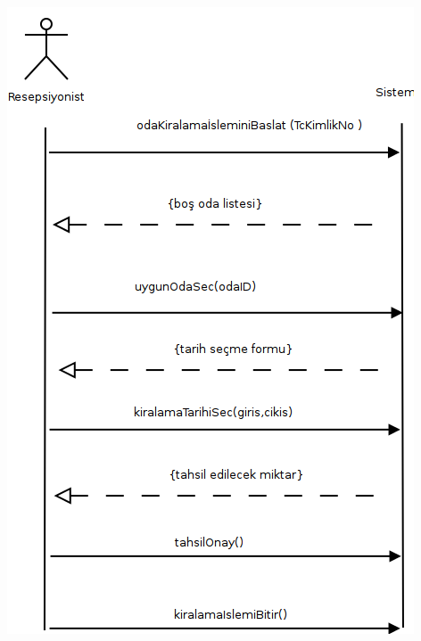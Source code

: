 \documentclass[12pt,a4paper]{report}
\begin{document}
\newpage

\begin{center}
\includegraphics{dia/ssd-usecase2.png}
\end{center}

\newpage
\end{document}
